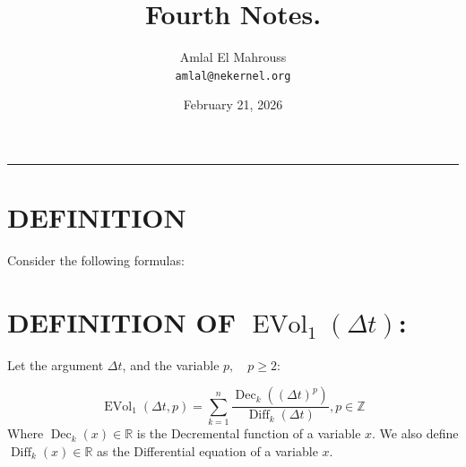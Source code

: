 \documentclass[11pt, a4paper]{article}
\title{Fourth Notes.}
\author{Amlal El Mahrouss\\\texttt{amlal@nekernel.org}}
\date{February 21, 2026}
\begin{document}
\maketitle

\begin{center}
	\rule[0.01cm]{17cm}{0.01cm}
\end{center}

\section{DEFINITION}

Consider the following formulas: 

\section{DEFINITION OF $\operatorname{EVol}_{1}(\Delta t)$:}

Let the argument $\Delta t$, and the variable $p, \quad p \geq 2$:

\begin{equation}
    \operatorname{EVol}_{1}(\Delta t, p) = \sum_{k=1}^{n} \frac{\operatorname{Dec}_{k}((\Delta t)^{p})}{\operatorname{Diff}_{k}(\Delta t)}, p \in \mathbb{Z}
\end{equation}
Where $\operatorname{Dec}_{k}(x) \in \mathbb{R}$ is the Decremental function of a variable $x$. We also define $\operatorname{Diff}_{k}(x) \in \mathbb{R}$ as the Differential equation of a variable $x$.
\end{document}
